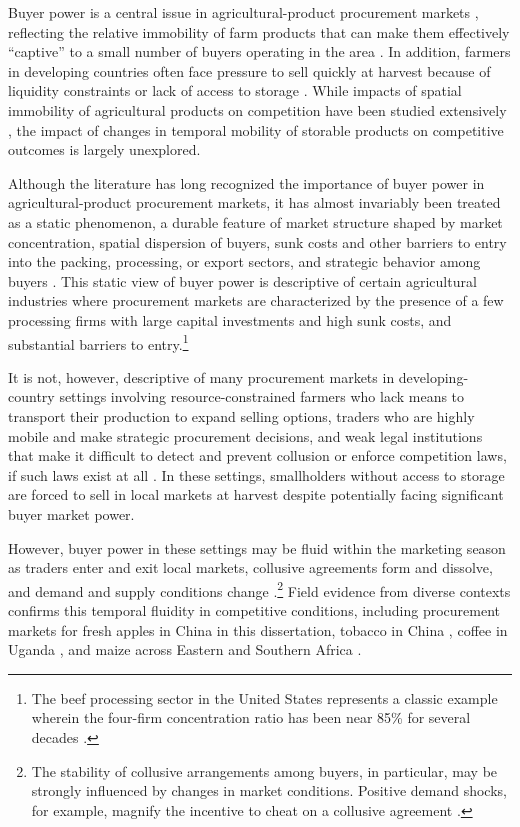 \noindent Buyer power is a central issue in agricultural-product procurement markets \citep{rogers_rich_1994assessing, barrett2022agri}, reflecting the relative immobility of farm products that can make them effectively ``captive'' to a small number of buyers operating in the area \citep{merel2017buyer}. In addition, farmers in developing countries often face pressure to sell quickly at harvest because of liquidity constraints or lack of access to storage \citep{bergquist_dinerstein_2020, Kopp-Mishra, nindi2024incentive, itin2024effect}.  While impacts of spatial immobility of agricultural products on competition have been studied extensively \citep{jung2022structural, BARTKUS2022, chatterjee2023market,graubner2023more}, the impact of changes in temporal mobility of storable products on competitive outcomes is largely unexplored.

Although the literature has long recognized the importance of buyer power in agricultural-product procurement markets, it has almost invariably been treated as a static phenomenon, a durable feature of market structure shaped by market concentration, spatial dispersion of buyers, sunk costs and other barriers to entry into the packing, processing, or export sectors, and strategic behavior among buyers \citep{sexton2013market}.
This static view of buyer power is descriptive of certain agricultural industries where procurement markets are characterized by the presence of a few processing firms with large capital investments and high sunk costs, and substantial barriers to entry.\footnote{The beef processing sector in the United States represents a classic example wherein the four-firm concentration ratio has been near 85\% for several decades \citep{Moschini-Smith}.}

It is not, however, descriptive of many procurement markets in developing-country settings involving resource-constrained farmers who lack means to transport their production to expand selling options, traders who are highly mobile and make strategic procurement decisions, and weak legal institutions that make it difficult to detect and prevent collusion or enforce competition laws, if such laws exist at all \citep{sexton2018increasing}. In these settings, smallholders without access to storage are forced to sell in local markets at harvest despite potentially facing significant buyer market power.

However, buyer power in these settings may be fluid within the marketing season as traders enter and exit local markets, collusive agreements form and dissolve, and demand and supply conditions change \citep{kopp2021farmers}.\footnote{The stability of collusive arrangements among buyers, in particular, may be strongly influenced by changes in market conditions. Positive demand shocks, for example, magnify the incentive to cheat on a collusive agreement \citep{Rotemberg_1986, richards2001price, sudhir2005time}.}
Field evidence from diverse contexts confirms this temporal fluidity in competitive conditions, including procurement markets for fresh apples in China in this dissertation, tobacco in China \citep{rubens2023market}, coffee in Uganda \citep{fafchamps2005selling}, and maize across Eastern and Southern Africa \citep{sitko2014exploitative, burke2019sell}.

